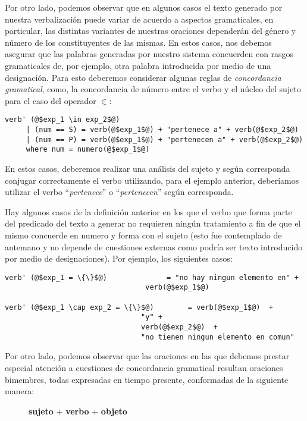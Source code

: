 Por otro lado, podemos observar que en algunos casos el texto generado por nuestra verbalización puede variar de acuerdo a aspectos gramaticales, en particular, las distintas variantes de nuestras oraciones dependerán del género y número de los constituyentes de las mismas. En estos casos, nos debemos asegurar que las palabras generadas por nuestro sistema concuerden con rasgos gramaticales de, por ejemplo, otra palabra introducida por medio de una designación. Para esto deberemos considerar algunas reglas de \emph{concordancia gramatical}, como, la concordancia de número entre el verbo y el núcleo del sujeto para el caso del operador $\in$:


\begin{verbatim}
verb' (@$exp_1 \in exp_2$@)
     | (num == S) = verb(@$exp_1$@) + "pertenece a" + verb(@$exp_2$@) 
     | (num == P) = verb(@$exp_1$@) + "pertenecen a" + verb(@$exp_2$@) 
     where num = numero(@$exp_1$@)
\end{verbatim} 

\bigskip
En estos casos, deberemos realizar una análisis del sujeto y según corresponda conjugar correctamente el verbo utilizando, para el ejemplo anterior, deberíamos utilizar el verbo ``\emph{pertenece}'' o ``\emph{pertenecen}'' según corresponda.

Hay algunos casos de la definición anterior en los que el verbo que forma parte del predicado del texto a generar no requieren ningún tratamiento a fin de que el mismo concuerde en numero y forma con el sujeto (esto fue contemplado de antemano y no depende de cuestiones externas como podría ser texto introducido por medio de designaciones). Por ejemplo, los siguientes casos:

\begin{verbatim}
verb' (@$exp_1 = \{\}$@)              = "no hay ningun elemento en" + 
                                 verb(@$exp_1$@) 
                                 
verb' (@$exp_1 \cap exp_2 = \{\}$@)        = verb(@$exp_1$@)  +  
                                "y" +  
                                verb(@$exp_2$@)  +  
                                "no tienen ningun elemento en comun"
\end{verbatim} 

\bigskip
Por otro lado, podemos observar que las oraciones en las que debemos prestar especial atención a cuestiones de concordancia gramatical resultan oraciones bimembres, todas expresadas en tiempo presente, conformadas de la siguiente manera: 
\begin{figure}[H]
\center
\textbf{sujeto} + \textbf{verbo} + \textbf{objeto}
\end{figure}

